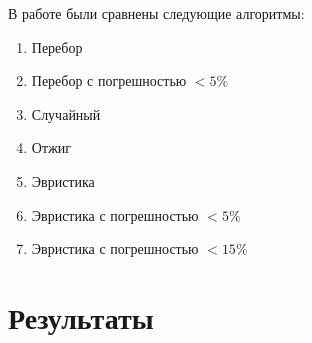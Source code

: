 \documentclass[pscyr,specification,annotation]{itmo-student-thesis}
\begin{document}
В работе были сравнены следующие алгоритмы: 

\begin{enumerate}
        \item Перебор
        \item Перебор с погрешностью $<5\%$
        \item Случайный
        \item Отжиг
        \item Эвристика
        \item Эвристика с погрешностью $<5\%$
        \item Эвристика с погрешностью $<15\%$
\end{enumerate}

\section{Результаты}
\end{document}

